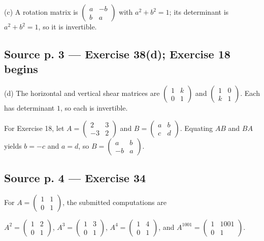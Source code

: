 (c) A rotation matrix is \(\begin{pmatrix}
a & {- b} \\
b & a
\end{pmatrix}\) with \(a^{2} + b^{2} = 1\); its determinant is \(a^{2} + b^{2} = 1\), so it is invertible.

\subsection{Source p. 3 --- Exercise 38(d); Exercise 18 begins}

(d) The horizontal and vertical shear matrices are \(\begin{pmatrix}
1 & k \\
0 & 1
\end{pmatrix}\) and \(\begin{pmatrix}
1 & 0 \\
k & 1
\end{pmatrix}\). Each has determinant \(1\), so each is invertible.

For Exercise 18, let \(A = \begin{pmatrix}
2 & 3 \\
{- 3} & 2
\end{pmatrix}\) and \(B = \begin{pmatrix}
a & b \\
c & d
\end{pmatrix}\). Equating \(AB\) and \(BA\) yields \(b = - c\) and \(a = d\), so \(B = \begin{pmatrix}
a & b \\
{- b} & a
\end{pmatrix}\).

\subsection{Source p. 4 --- Exercise 34}

For \(A = \begin{pmatrix}
1 & 1 \\
0 & 1
\end{pmatrix}\), the submitted computations are

\(A^{2} = \begin{pmatrix}
1 & 2 \\
0 & 1
\end{pmatrix}\), \(A^{3} = \begin{pmatrix}
1 & 3 \\
0 & 1
\end{pmatrix}\), \(A^{4} = \begin{pmatrix}
1 & 4 \\
0 & 1
\end{pmatrix}\), and \(A^{1001} = \begin{pmatrix}
1 & 1001 \\
0 & 1
\end{pmatrix}\).

